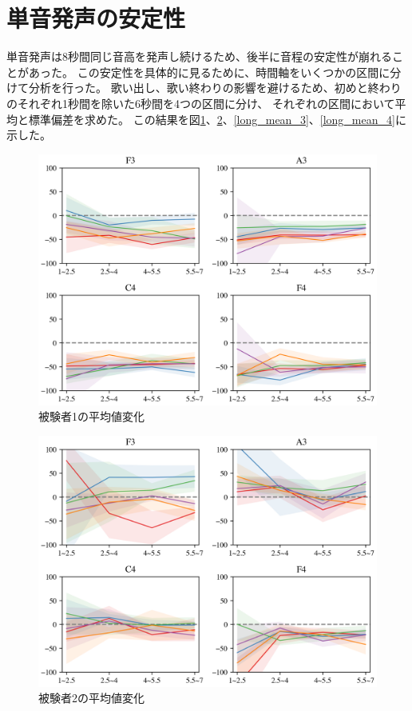 \documentclass[10.5ptj,a4j,dvipdfmx,uplatex, oneside, openany]{jsbook}%
\begin{document}
\section{単音発声の安定性}
単音発声は8秒間同じ音高を発声し続けるため、後半に音程の安定性が崩れることがあった。
この安定性を具体的に見るために、時間軸をいくつかの区間に分けて分析を行った。
歌い出し、歌い終わりの影響を避けるため、初めと終わりのそれぞれ1秒間を除いた6秒間を4つの区間に分け、
それぞれの区間において平均と標準偏差を求めた。
この結果を図\ref{long_mean_1}、\ref{long_mean_2}、\ref{long_mean_3}、\ref{long_mean_4}に示した。

\begin{figure}[htbp]
    \begin{center}
      \includegraphics[clip,width=12.0cm]{long_mean_1.png}
      \caption{被験者1の平均値変化}
      \label{long_mean_1}
    \end{center}
\end{figure}

\begin{figure}[htbp]
    \begin{center}
      \includegraphics[clip,width=12.0cm]{long_mean_2.png}
      \caption{被験者2の平均値変化}
      \label{long_mean_2}
    \end{center}
\end{figure}
\end{document}
